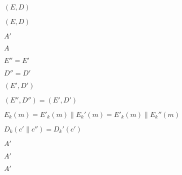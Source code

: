 \documentclass[10pt]{book}
\begin{document}
\begin{mdSnippets}
\begin{mdInlineSnippet}[c150726dc018e82825c0c3617f46a1c9]
$(E,D)$\end{mdInlineSnippet}%
\begin{mdInlineSnippet}[c150726dc018e82825c0c3617f46a1c9]%
$(E,D)$\end{mdInlineSnippet}%
\begin{mdInlineSnippet}[37a12b78a9ca96989ad7ceceacb37ea2]%
$A'$\end{mdInlineSnippet}%
\begin{mdInlineSnippet}[7fc56270e7a70fa81a5935b72eacbe29]%
$A$\end{mdInlineSnippet}%
\begin{mdInlineSnippet}[68785f33e1e9957572b557773d1ca639]%
$E'' = E'$\end{mdInlineSnippet}%
\begin{mdInlineSnippet}[6f48e53f19bf278969814936c667fa63]%
$D'' = D'$\end{mdInlineSnippet}%
\begin{mdInlineSnippet}%
$(E',D')$\end{mdInlineSnippet}%
\begin{mdInlineSnippet}%
$(E'',D'') = (E',D')$\end{mdInlineSnippet}%
\begin{mdInlineSnippet}[7e7e081bdbb27c2fb0a35b4338d7bd94]%
$E_k(m) = E'_k(m) \| E_k'(m) =  E'_k(m) \| E_k''(m)$\end{mdInlineSnippet}%
\begin{mdInlineSnippet}%
$D_k(c' \| c'') = D_k'(c')$\end{mdInlineSnippet}%
\begin{mdInlineSnippet}[37a12b78a9ca96989ad7ceceacb37ea2]%
$A'$\end{mdInlineSnippet}%
\begin{mdInlineSnippet}[37a12b78a9ca96989ad7ceceacb37ea2]%
$A'$\end{mdInlineSnippet}%
\begin{mdInlineSnippet}[37a12b78a9ca96989ad7ceceacb37ea2]%
$A'$\end{mdInlineSnippet}%
\begin{mdInlineSnippet}[7fc56270e7a70fa81a5935b72eacbe29]%

\end{mdInlineSnippet}
\end{mdSnippets}
\end{document}
